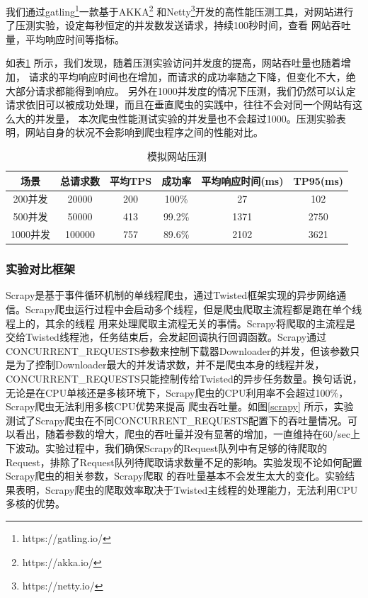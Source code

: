 \documentclass[master]{njuthesis}
\begin{document}
我们通过gatling\footnote{https://gatling.io/}{\zhdash}一款基于AKKA\footnote{https://akka.io/} 和Netty\footnote{https://netty.io/}开发的高性能压测工具，对网站进行了压测实验，设定每秒恒定的并发数发送请求，持续100秒时间，查看
网站吞吐量，平均响应时间等指标。

如表\ref{table:pressure-test} 所示，我们发现，随着压测实验访问并发度的提高，网站吞吐量也随着增加，
请求的平均响应时间也在增加，而请求的成功率随之下降，但变化不大，绝大部分请求都能得到响应。
另外在1000并发度的情况下压测，我们仍然可以认定请求依旧可以被成功处理，而且在垂直爬虫的实践中，往往不会对同一个网站有这么大的并发量，
本次爬虫性能测试实验的并发量也不会超过1000。压测实验表明，网站自身的状况不会影响到爬虫程序之间的性能对比。

\begin{table}
\centering
\begin{tabular}{|c|c|c|c|c|c|}
\hline
场景 & 总请求数 & 平均TPS & 成功率 & 平均响应时间(ms) & TP95(ms) \\
\hline
200并发 & 20000 & 200 & 100\% & 27 & 102 \\
\hline
500并发 & 50000 & 413 & 99.2\% & 1371 & 2750 \\
\hline
1000并发 & 100000 & 757 & 89.6\%  & 2102 & 3621 \\
\hline
\end{tabular}
\caption{模拟网站压测}\label{table:pressure-test}
\end{table}

\subsubsection{实验对比框架}
Scrapy是基于事件循环机制的单线程爬虫，通过Twisted框架实现的异步网络通信。Scrapy爬虫运行过程中会启动多个线程，但是爬虫爬取主流程都是跑在单个线程上的，其余的线程
用来处理爬取主流程无关的事情。Scrapy将爬取的主流程是交给Twisted线程池，任务结束后，会发起回调执行回调函数。Scrapy通过CONCURRENT\_REQUESTS参数来控制下载器Downloader的并发，但该参数只是为了控制Downloader最大的并发请求数，并不是爬虫本身的线程并发，CONCURRENT\_REQUESTS只能控制传给Twisted的异步任务数量。换句话说，无论是在CPU单核还是多核环境下，Scrapy爬虫的CPU利用率不会超过100\%，Scrapy爬虫无法利用多核CPU优势来提高
爬虫吞吐量。如图\ref{scrapy} 所示，实验测试了Scrapy爬虫在不同CONCURRENT\_REQUESTS配置下的吞吐量情况。可以看出，随着参数的增大，爬虫的吞吐量并没有显著的增加，一直维持在60/sec上下波动。实验过程中，我们确保Scrapy的Request队列中有足够的待爬取的Request，排除了Request队列待爬取请求数量不足的影响。实验发现不论如何配置Scrapy爬虫的相关参数，Scrapy爬取
的吞吐量基本不会发生太大的变化。实验结果表明，Scrapy爬虫的爬取效率取决于Twisted主线程的处理能力，无法利用CPU多核的优势。
\end{document}
